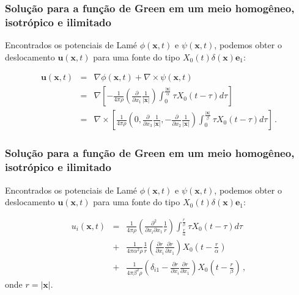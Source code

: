 \documentclass[xcolor=table]{beamer}
\newcommand{\xvec}{\mathbf{x}}
\newcommand{\evec}{\mathbf{e}}
\newcommand{\uvec}{\mathbf{u}}
\begin{document}
\begin{frame}
\frametitle{\textbf{Solu\c{c}\~ao para a fun\c{c}\~ao de Green em um meio homog\^eneo, isotr\'opico e ilimitado}}

\begin{flushleft}
Encontrados os potenciais de Lam\'e $\phi(\xvec,t)$ e $\psi(\xvec,t)$, podemos obter o deslocamento $\uvec(\xvec,t)$ para uma 
fonte do tipo $X_{0}(t)\delta(\xvec)\evec_1$:
\end{flushleft}
\begin{eqnarray}
  \label{ten1}
       \uvec(\xvec,t) &=& \nabla \phi(\xvec,t) + \nabla \times \psi(\xvec,t)\, \\
        &=& \nabla \left[ - \frac{1}{4\pi \rho}  \left( \frac{\partial }{\partial x_1} \frac{1}{\left| \xvec\right|} \right)  \int_{0}^{\frac{\left| \xvec\right|}{\alpha}} \tau X_{0}\left( t -\tau \right)  d\tau  \right] \, \\
        &=& \nabla \times \left[ \frac{1}{4\pi\rho}  \left(0, \frac{\partial }{\partial x_3} \frac{1}{\left| \xvec \right|}, -\frac{\partial }{\partial x_2} \frac{1}{\left| \xvec \right|} \right) \int_{0}^{\frac{\left| \xvec\right|}{\beta}} \tau X_{0}\left( t -\tau \right)  d\tau\right] \, .
\end{eqnarray}

\end{frame}%


\begin{frame}
\frametitle{\textbf{Solu\c{c}\~ao para a fun\c{c}\~ao de Green em um meio homog\^eneo, isotr\'opico e ilimitado}}

\begin{flushleft}
Encontrados os potenciais de Lam\'e $\phi(\xvec,t)$ e $\psi(\xvec,t)$, podemos obter o deslocamento $\uvec(\xvec,t)$ para uma 
fonte do tipo $X_{0}(t)\delta(\xvec)\evec_1$:
\end{flushleft}
\begin{eqnarray}
  \label{ten1}
       u_i(\xvec,t) &=& 
      \frac{1}{4\pi \rho}  \left( \frac{\partial^2 }{\partial x_i \partial x_1} \frac{1}{r } \right)  \int_{ \frac{r }{\alpha}}^{ \frac{r}{\beta}} \tau X_{0} \left( t -\tau \right)  d\tau\, \\      
       &+& \frac{1}{4\pi \alpha^2 \rho} \frac{1}{r}  \left(\frac{\partial r}{ \partial x_i} \frac{\partial r}{ \partial x_1}  \right)  X_{0} \left(t - \frac{r}{\alpha} \right) \\
       &+& \frac{1}{4\pi\beta^2 \rho} \left( \delta_{i1}  -  \frac{\partial r}{ \partial x_i} \frac{\partial r}{ \partial x_1}  \right) X_{0} \left(t - \frac{r}{\beta} \right)  \, ,
\end{eqnarray}
onde $r = \left| \xvec \right|$.

\end{frame}%
\end{document}
